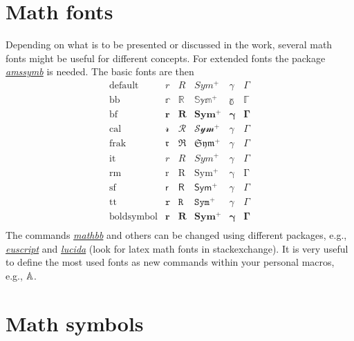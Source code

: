 \documentclass[a4paper]{book}
\newcommand{\imp}[1]{\underline{\textit{#1}}}
\begin{document}

\section{Math fonts}

Depending on what is to be presented or discussed in the work, several math fonts might be useful for different concepts. For extended fonts the package \imp{amssymb} is needed. The basic fonts are then
\[
	\begin{array}{lccccc}
	\text{default} & r & R & Sym^+ & \gamma & \Gamma \\
	\text{bb} & \mathbb{r} & \mathbb{R} & \mathbb{Sym^+} & \mathbb{\gamma}& \mathbb{\Gamma} \\ 
	\text{bf} & \mathbf{r} & \mathbf{R} & \mathbf{Sym^+} & \mathbf{\gamma}& \mathbf{\Gamma} \\
	\text{cal} & \mathcal{r} & \mathcal{R} & \mathcal{Sym^+} & \mathcal{\gamma}& \mathcal{\Gamma} \\
	\text{frak} & \mathfrak{r} & \mathfrak{R} & \mathfrak{Sym^+} & \mathfrak{\gamma}& \mathfrak{\Gamma} \\
	\text{it} & \mathit{r} & \mathit{R} & \mathit{Sym^+} & \mathit{\gamma}& \mathit{\Gamma} \\
	\text{rm} & \mathrm{r} & \mathrm{R} & \mathrm{Sym^+} & \mathrm{\gamma}& \mathrm{\Gamma} \\
	\text{sf} & \mathsf{r} & \mathsf{R} & \mathsf{Sym^+} & \mathsf{\gamma}& \mathsf{\Gamma} \\
	\text{tt} & \mathtt{r} & \mathtt{R} & \mathtt{Sym^+} & \mathtt{\gamma}& \mathtt{\Gamma} \\
	\text{boldsymbol} & \boldsymbol{r} & \boldsymbol{R} & \boldsymbol{Sym^+} & \boldsymbol{\gamma}& \boldsymbol{\Gamma} \\
	\end{array}
\]
The commands \imp{mathbb} and others can be changed using different packages, e.g., \imp{euscript} and \imp{lucida} (look for latex math fonts in stackexchange). It is very useful to define the most used fonts as new commands within your personal macros, e.g., $\mathbb{A}$.


\section{Math symbols}
\label{math_msymb}
\end{document}
